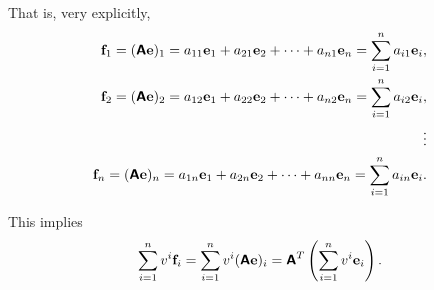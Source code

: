 That is, very explicitly,
\begin{equation}
\begin{split}
{\bf f}_1=
(\textsf{\textbf{A}}{\bf e})_1
=
a_{11} {\bf e}_1 +a_{21} {\bf e}_2+\cdots +a_{n1} {\bf e}_n    = \sum_{i=1}^n a_{i1}{\bf e}_i,\\
{\bf f}_2=
(\textsf{\textbf{A}}{\bf e})_2
=
a_{12} {\bf e}_1 +a_{22} {\bf e}_2+\cdots +a_{n2} {\bf e}_n    = \sum_{i=1}^n a_{i2}{\bf e}_i,\\
 \vdots \\
{\bf f}_n=
(\textsf{\textbf{A}}{\bf e})_n
= a_{1n} {\bf e}_1 +a_{2n} {\bf e}_2+\cdots +a_{nn} {\bf e}_n    = \sum_{i=1}^n a_{in}{\bf e}_i.
\end{split}
\label{2011-m-btbe-eigen}
\end{equation}

This implies
\begin{equation}
\sum_{i=1}^n v^i {\bf f}_i= \sum_{i=1}^n v^i (\textsf{\textbf{A}}{\bf e})_i
= \textsf{\textbf{A}}^T \left(\sum_{i=1}^n v^i{\bf e}_i\right)
.
\label{2011-m-btbe-2-implied}
\end{equation}

